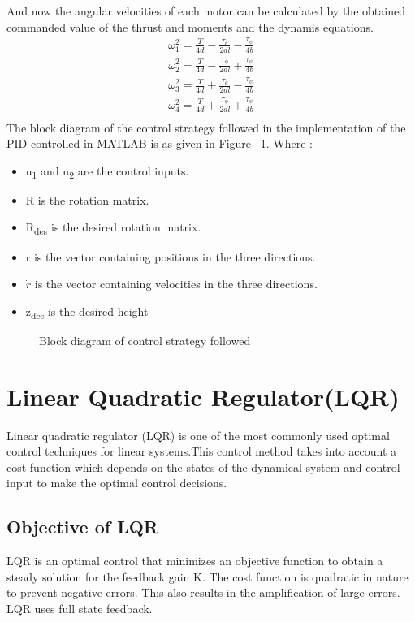 \noindent
And now the angular velocities of each motor can be calculated by the obtained commanded value of the thrust and moments and the dynamis equations.
\begin{align*}
  \omega_1^2 = \frac{T}{4d} - \frac{\tau_\theta}{2dl} - \frac{\tau_\psi}{4b} \\
  \omega_2^2 = \frac{T}{4d} - \frac{\tau_\phi}{2dl} + \frac{\tau_\psi}{4b} \\
  \omega_3^2 = \frac{T}{4d} + \frac{\tau_\theta}{2dl} - \frac{\tau_\psi}{4b} \\
  \omega_4^2 = \frac{T}{4d} + \frac{\tau_\phi}{2dl} + \frac{\tau_\psi}{4b} \\
\end{align*}
\newline
The block diagram of the control strategy followed in the implementation of the PID controlled in MATLAB is as given in Figure ~\ref{fig:block_diagram}. Where :
\begin{itemize}
  \item u\textsubscript{1} and u\textsubscript{2} are the control inputs.
  \item R is the rotation matrix.
  \item R\textsubscript{des} is the desired rotation matrix.
  \item r is the vector containing positions in the three directions.
  \item $\dot{r}$ is the vector containing velocities in the three directions.
  \item z\textsubscript{des} is the desired height
\end{itemize}

\begin{figure}[H]
  \centering
  \noindent{}
  \caption{Block diagram of control strategy followed}
  \label{fig:block_diagram}
\end{figure}

\section{Linear Quadratic Regulator(LQR)}
Linear quadratic regulator (LQR) is one of the most commonly used optimal control techniques for linear systems.This control method takes into account a cost function which depends on the states of the dynamical system and control input to make the optimal control decisions.
\subsection{Objective of LQR}
LQR is an optimal control that minimizes an objective function to obtain a steady solution for the feedback gain K. The cost function is quadratic in nature to prevent negative errors. This also results in the amplification of large errors. LQR uses full state feedback.
